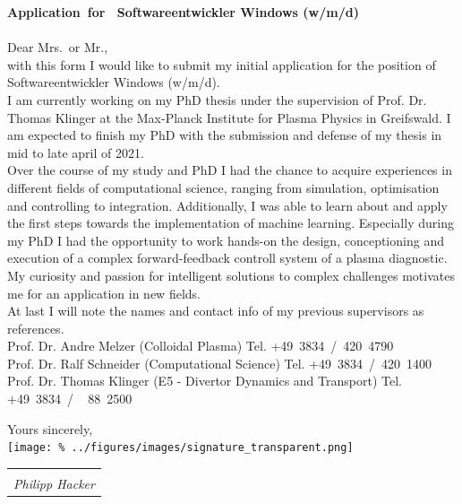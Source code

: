 \documentclass[11pt,a4paper]{moderncv}
\makeatletter
\newcommand{\sign}[1]{%
  \begin{tabular}[t]{@{}l@{}}
  \makebox[1.5in]{\dotfill}\\
  \strut\emph{#1}\strut%
  \end{tabular}}%
\newcommand{\position}{%
    Softwareentwickler Windows (w/m/d)}
\makeatother
\begin{document}
    \vspace*{1.0cm}
    {\bfseries \color{familynamecolor}%
        Application~for~\position\\
    }\\[0.75cm]
%
    Dear Mrs.\ or Mr.,\\[0.75cm]%
%
    with this form I would like to submit my initial application for the position of~\position.\\[0.75cm]  %
%
        I am currently working on my PhD thesis under the supervision of Prof. Dr. Thomas Klinger at the Max-Planck Institute for Plasma Physics in Greifswald. I am expected to finish my PhD with the submission and defense of my thesis in mid to late april of 2021.\\[0.75cm]%
%
        Over the course of my study and PhD I had the chance to acquire experiences in different fields of computational science, ranging from simulation, optimisation and controlling to integration. Additionally, I was able to learn about and apply the first steps towards the implementation of machine learning. Especially during my PhD I had the opportunity to work hands-on the design, conceptioning and execution of a complex forward-feedback controll system of a plasma diagnostic. My curiosity and passion for intelligent solutions to complex challenges motivates me for an application in new fields.\\[0.75cm]%
%
        At last I will note the names and contact info of my previous supervisors as references.\\[0.5cm]
        \hspace*{0.5cm}Prof. Dr. Andre Melzer (Colloidal Plasma)%
            \hfill Tel. +49~3834~/~420~4790\\
        \hspace*{0.5cm}Prof. Dr. Ralf Schneider (Computational Science)%
            \hfill Tel. +49~3834~/~420~1400\\
        \hspace*{0.5cm}Prof. Dr. Thomas Klinger (E5 - Divertor Dynamics and Transport)%
            \hfill Tel. +49~3834~/~~\,88~2500\\
%
    \vspace*{0.2cm}
    \begin{flushleft}
        Yours sincerely,\\[0.75cm]
        \vspace*{-1.0cm}%
        \texttt{[image: \%
            ../figures/images/signature\_transparent.png]}
        \hspace*{-4.0cm}\sign{Philipp Hacker}\\[0.0cm]
    \end{flushleft}
%
\end{document}

